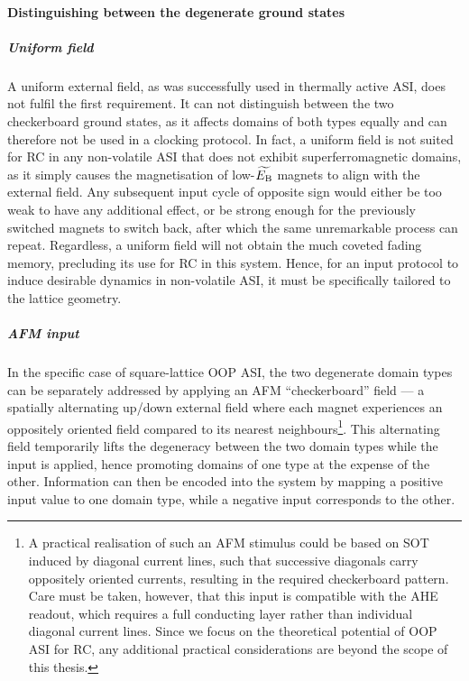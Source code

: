 \paragraph{Distinguishing between the degenerate ground states}
\subparagraph{Uniform field}
A uniform external field, as was successfully used in thermally active ASI, does not fulfil the first requirement.
It can not distinguish between the two checkerboard ground states, as it affects domains of both types equally and can therefore not be used in a clocking protocol.
In fact, a uniform field is not suited for RC in any non-volatile ASI that does not exhibit superferromagnetic domains, as it simply causes the magnetisation of low-$\widetilde{E_\mathrm{B}}$ magnets to align with the external field.
Any subsequent input cycle of opposite sign would either be too weak to have any additional effect, or be strong enough for the previously switched magnets to switch back, after which the same unremarkable process can repeat.
Regardless, a uniform field will not obtain the much coveted fading memory, precluding its use for RC in this system.
Hence, for an input protocol to induce desirable dynamics in non-volatile ASI, it must be specifically tailored to the lattice geometry.

\subparagraph{AFM input}
In the specific case of square-lattice OOP ASI, the two degenerate domain types can be separately addressed by applying an AFM ``checkerboard'' field --- a spatially alternating up/down external field where each magnet experiences an oppositely oriented field compared to its nearest neighbours\footnote{
	A practical realisation of such an AFM stimulus could be based on SOT induced by diagonal current lines, such that successive diagonals carry oppositely oriented currents, resulting in the required checkerboard pattern.
	Care must be taken, however, that this input is compatible with the AHE readout, which requires a full conducting layer rather than individual diagonal current lines.
	Since we focus on the theoretical potential of OOP ASI for RC, any additional practical considerations are beyond the scope of this thesis.
}.
This alternating field temporarily lifts the degeneracy between the two domain types while the input is applied, hence promoting domains of one type at the expense of the other.
Information can then be encoded into the system by mapping a positive input value to one domain type, while a negative input corresponds to the other.

